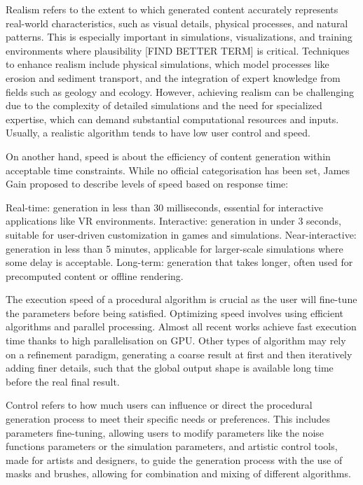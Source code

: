 
Realism refers to the extent to which generated content accurately represents real-world characteristics, such as visual details, physical processes, and natural patterns. This is especially important in simulations, visualizations, and training environments where plausibility [FIND BETTER TERM] is critical. Techniques to enhance realism include physical simulations, which model processes like erosion and sediment transport, and the integration of expert knowledge from fields such as geology and ecology. However, achieving realism can be challenging due to the complexity of detailed simulations and the need for specialized expertise, which can demand substantial computational resources and inputs. Usually, a realistic algorithm tends to have low user control and speed.

On another hand, speed is about the efficiency of content generation within acceptable time constraints. While no official categorisation has been set, James Gain proposed to describe levels of speed based on response time:
\begin{Itemize}
    \Item{} Real-time: generation in less than 30 milliseconds, essential for interactive applications like VR environments. 
    \Item{} Interactive: generation in under 3 seconds, suitable for user-driven customization in games and simulations. 
    \Item{} Near-interactive: generation in less than 5 minutes, applicable for larger-scale simulations where some delay is acceptable. 
    \Item{} Long-term: generation that takes longer, often used for precomputed content or offline rendering.
\end{Itemize}

The execution speed of a procedural algorithm is crucial as the user will fine-tune the parameters before being satisfied.
Optimizing speed involves using efficient algorithms and parallel processing. Almost all recent works achieve fast execution time thanks to high parallelisation on GPU. Other types of algorithm may rely on a refinement paradigm, generating a coarse result at first and then iteratively adding finer details, such that the global output shape is available long time before the real final result.

Control refers to how much users can influence or direct the procedural generation process to meet their specific needs or preferences. This includes parameters fine-tuning, allowing users to modify parameters like the noise functions parameters or the simulation parameters, and artistic control tools, made for artists and designers, to guide the generation process with the use of masks and brushes, allowing for combination and mixing of different algorithms.


